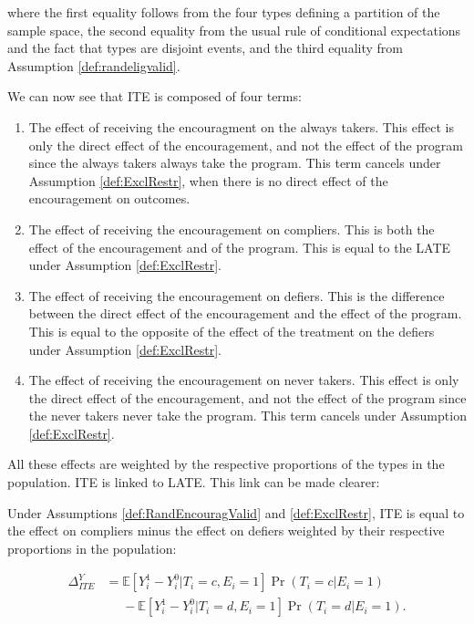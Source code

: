 \documentclass[]{book}
\providecommand{\tightlist}{%
  \setlength{\itemsep}{0pt}\setlength{\parskip}{0pt}}
\newcommand{\esp}[1]{\mathbb{E}[ #1 ]}
\theoremstyle{definition}
\theoremstyle{definition}
\theoremstyle{definition}
\theoremstyle{remark}
\let\BeginKnitrBlock\begin \let\EndKnitrBlock\end
\begin{document}
where the first equality follows from the four types defining a
partition of the sample space, the second equality from the usual rule
of conditional expectations and the fact that types are disjoint events,
and the third equality from Assumption \ref{def:randeligvalid}.

We can now see that ITE is composed of four terms:

\begin{enumerate}
\def\labelenumi{\arabic{enumi}.}
\tightlist
\item
  The effect of receiving the encouragment on the always takers. This
  effect is only the direct effect of the encouragement, and not the
  effect of the program since the always takers always take the program.
  This term cancels under Assumption \ref{def:ExclRestr}, when there is
  no direct effect of the encouragement on outcomes.
\item
  The effect of receiving the encouragement on compliers. This is both
  the effect of the encouragement and of the program. This is equal to
  the LATE under Assumption \ref{def:ExclRestr}.
\item
  The effect of receiving the encouragement on defiers. This is the
  difference between the direct effect of the encouragement and the
  effect of the program. This is equal to the opposite of the effect of
  the treatment on the defiers under Assumption \ref{def:ExclRestr}.
\item
  The effect of receiving the encouragement on never takers. This effect
  is only the direct effect of the encouragement, and not the effect of
  the program since the never takers never take the program. This term
  cancels under Assumption \ref{def:ExclRestr}.
\end{enumerate}

All these effects are weighted by the respective proportions of the
types in the population. ITE is linked to LATE. This link can be made
clearer:

\BeginKnitrBlock{theorem}[From ITE to Compliers and Defiers]
\protect\hypertarget{thm:ITELATE}{}{\label{thm:ITELATE} \iffalse (From ITE
to Compliers and Defiers) \fi{} }Under Assumptions
\ref{def:RandEncouragValid} and \ref{def:ExclRestr}, ITE is equal to the
effect on compliers minus the effect on defiers weighted by their
respective proportions in the population:

\begin{align*}
  \Delta^Y_{ITE} & = \esp{Y_i^{1}-Y_i^{0}|T_i=c,E_i=1}\Pr(T_i=c|E_i=1)\\
                  & \phantom{=}-\esp{Y_i^{1}-Y_i^{0}|T_i=d,E_i=1}\Pr(T_i=d|E_i=1).
\end{align*}
\EndKnitrBlock{theorem}
\end{document}
